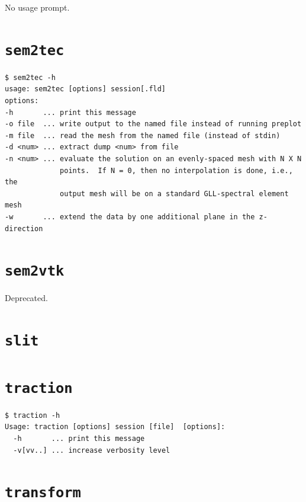 \documentclass[11pt]{report}
\begin{document}
No usage prompt.

\section{\texttt{sem2tec}}
\label{sec.sem2tec}

{\small
\begin{verbatim}
$ sem2tec -h
usage: sem2tec [options] session[.fld]
options:
-h       ... print this message
-o file  ... write output to the named file instead of running preplot
-m file  ... read the mesh from the named file (instead of stdin)
-d <num> ... extract dump <num> from file
-n <num> ... evaluate the solution on an evenly-spaced mesh with N X N
             points.  If N = 0, then no interpolation is done, i.e., the
             output mesh will be on a standard GLL-spectral element mesh
-w       ... extend the data by one additional plane in the z-direction
\end{verbatim}
}
%

\section{\texttt{sem2vtk}}
\label{sec.sem2vtk}

Deprecated.

\section{\texttt{slit}}
\label{sec.slit}

\section{\texttt{traction}}
\label{sec.tractionu}

{\small
\begin{verbatim}
$ traction -h
Usage: traction [options] session [file]  [options]:
  -h       ... print this message
  -v[vv..] ... increase verbosity level
\end{verbatim}
}
%

\section{\texttt{transform}}
\label{sec.transform}
\end{document}
